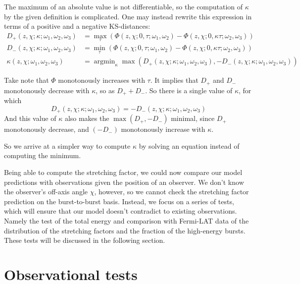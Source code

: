 \documentclass[manuscript]{aastex}
\DeclareMathOperator*{\argmin}{argmin}
\begin{document}
The maximum of an absolute value is not differentiable, so the
computation of $\kappa$ by the given definition is complicated. One
may instead rewrite this expression in terms of a positive and a
negative KS-distances:
\begin{align*}
D_+\left(z,\chi; \kappa; \omega_1, \omega_2, \omega_3\right) &= \max_\tau\left( \Phi\left(z,\chi; 0,\tau; \omega_1,\omega_2\right) - \Phi\left( z,\chi; 0,\kappa \tau; \omega_2,\omega_3 \right) \right) \\
D_-\left(z,\chi; \kappa; \omega_1, \omega_2, \omega_3\right) &= \min_\tau\left( \Phi\left(z,\chi; 0,\tau; \omega_1,\omega_2\right) - \Phi\left( z,\chi; 0,\kappa \tau; \omega_2,\omega_3 \right) \right) \\
\kappa\left(z,\chi; \omega_1, \omega_2, \omega_3\right) &= \argmin_\kappa \max\left(D_+\left(z,\chi; \kappa; \omega_1, \omega_2, \omega_3\right), -D_-\left(z,\chi; \kappa; \omega_1, \omega_2, \omega_3\right)\right)
\end{align*}

Take note that $\Phi$ monotonously increases with $\tau$. It implies that $D_+$ and $D_-$ monotonously decrease with $\kappa$, so as $D_+ + D_-$. So there is a single value of $\kappa$, for which
\begin{equation}
D_+\left(z,\chi; \kappa; \omega_1, \omega_2, \omega_3\right) = -D_-\left(z,\chi; \kappa; \omega_1, \omega_2, \omega_3\right)
\end{equation}
And this value of $\kappa$ also makes the $\max\left({D_+, -D_-}\right)$ minimal, since $D_+$ monotonously decrease, and $\left(-D_-\right)$ monotonously increase with $\kappa$.

So we arrive at a simpler way to compute $\kappa$ by solving an
equation instead of computing the minimum. 

Being able to compute the stretching factor, we could now compare our
model predictions with observations given the position of an
observer. We don't know the observer's off-axis angle $\chi$, however,
so we cannot check the stretching factor prediction on the
burst-to-burst basis. Instead, we focus on a series of tests, which
will ensure that our model doesn't contradict to existing
observations. Namely the test of the total energy and comparison with
Fermi-LAT data of the distribution of the stretching factors and the
fraction of the high-energy bursts. These tests will be discussed in
the following section.

\section{Observational tests}
\label{sec:tests}
\end{document}
